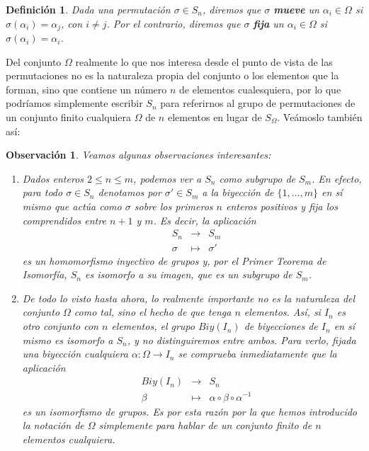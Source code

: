 \documentclass[12pt]{article}
\newtheorem{definition}[theorem]{Definición}
\newtheorem{observation}{Observación}[theorem]
\begin{document}
\begin{definition}Dada una permutación $\sigma \in S_n$, diremos que $\sigma$ \textbf{mueve} un $\alpha_i \in \Omega$ si $\sigma( \alpha_i) = \alpha_j$, con $i\neq j$. Por el contrario, diremos que $\sigma$ \textbf{fija} un $\alpha_i \in \Omega$ si $\sigma (\alpha_i ) = \alpha_i$.
\end{definition}

Del conjunto $\Omega$ realmente lo que nos interesa desde el punto de vista de las permutaciones no es la naturaleza propia del conjunto o los elementos que la forman, sino que contiene un número $n$ de elementos cualesquiera, por lo que podríamos simplemente escribir $S_n$ para referirnos al grupo de permutaciones de un conjunto finito cualquiera $\Omega$ de $n$ elementos en lugar de $S_\Omega$. Veámoslo también así:

\begin{observation}\label{eq:obsabel} Veamos algunas observaciones interesantes:
\begin{enumerate}
\item Dados enteros $2 \leq n \leq m$, podemos ver a $S_{n}$ como subgrupo de $S_{m}$. En efecto, para todo $\sigma \in S_{n}$ denotamos por $\sigma' \in S_{m}$ a la biyección de $\lbrace 1, \ldots, m \rbrace$ en sí mismo que actúa como $\sigma$ sobre los primeros $n$ enteros positivos y fija los comprendidos entre $n+1$ y $m$. Es decir, la aplicación $$\begin{array}{rccl}
&S_{n}& \longrightarrow &S_{m}\\
&\sigma& \longmapsto &\sigma'
\end{array}
$$ es un homomorfismo inyectivo de grupos y, por el \textit{Primer Teorema de Isomorfía}, $S_{n}$ es isomorfo a su imagen, que es un subgrupo de $S_{m}$.
\item De todo lo visto hasta ahora, lo realmente importante no es la naturaleza del conjunto $\Omega$ como tal, sino el hecho de que tenga $n$ elementos. Así, si $I_{n}$ es otro conjunto con $n$ elementos, el grupo $Biy(I_{n})$ de biyecciones de $I_{n}$ en sí mismo es isomorfo a $S_{n}$, y no distinguiremos entre ambos. Para verlo, fijada una biyección cualquiera $\alpha \colon \Omega \longrightarrow I_{n}$ se comprueba inmediatamente que la aplicación  $$\begin{array}{rccl}
&Biy(I_{n})& \longrightarrow &S_{n}\\
&\beta& \longmapsto &\alpha\circ \beta \circ \alpha^{-1}
\end{array}
$$ es un isomorfismo de grupos. Es por esta razón por la que hemos introducido la notación de $\Omega$ simplemente para hablar de un conjunto finito de $n$ elementos cualquiera.
\end{enumerate}
\end{observation}
\end{document}
